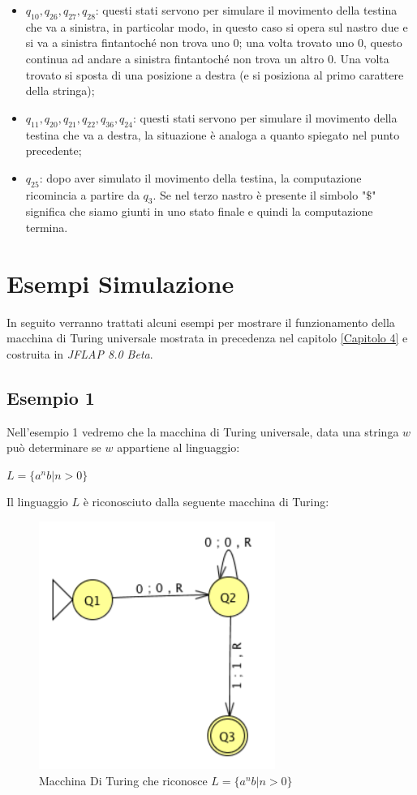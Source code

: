 \documentclass[a4paper,12pt,titlepage,oneside]{book}
\begin{document}
\begin{itemize}
	\item $q_{10}, q_{26}, q_{27}, q_{28}$: questi stati servono per simulare il movimento della testina che va a sinistra, in particolar modo, in questo caso si opera sul nastro due e si va a sinistra fintantoché non trova uno $0$; una volta trovato uno $0$, questo continua ad andare a sinistra fintantoché non trova un altro $0$. Una volta trovato si sposta di una posizione a destra (e si posiziona al primo carattere della stringa);
	\item $q_{11}, q_{20}, q_{21}, q_{22}, q_{36}, q_{24}$: questi stati servono per simulare il movimento della testina che va a destra, la situazione è analoga a quanto spiegato nel punto precedente;
	\item $q_{25}$: dopo aver simulato il movimento della testina, la computazione ricomincia a partire da $q_3$. Se nel terzo nastro è presente il simbolo "$\$$" significa che siamo giunti in uno stato finale e quindi la computazione termina.
\end{itemize}
		
	\chapter{Esempi Simulazione}
	
In seguito verranno trattati alcuni esempi per mostrare il funzionamento della macchina di Turing universale mostrata in precedenza nel capitolo \ref{Capitolo 4} e costruita in \emph{JFLAP 8.0 Beta}.

		\section{Esempio 1}
		
Nell'esempio 1 vedremo che la macchina di Turing universale, data una stringa $w$ può determinare se $w$ appartiene al linguaggio:

\begin{center}
	$L = \{a^n b | n > 0\}$
\end{center}

Il linguaggio $L$ è riconosciuto dalla seguente macchina di Turing:

\begin{figure}[!ht]
	\centering
	\includegraphics[width=.4\textwidth]{Images/mdt_linguaggio_1.png}
	\caption{Macchina Di Turing che riconosce $L = \{a^n b | n > 0\}$}
	\label{fig:mdt_linguaggio_1}
\end{figure}
\end{document}
